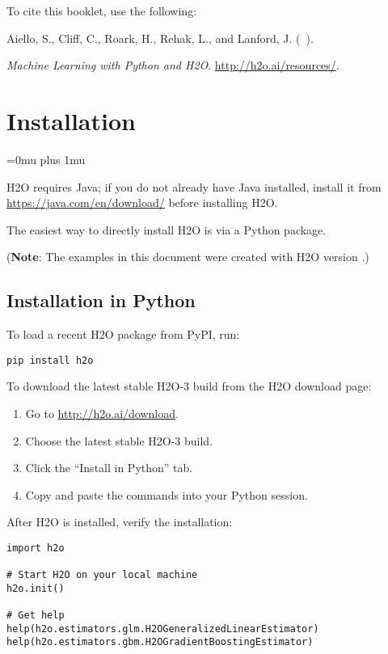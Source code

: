 To cite this booklet, use the following: 

Aiello, S., Cliff, C., Roark, H., Rehak, L., and Lanford, J. (\shortmonthname\ \the\year). {\textit{Machine Learning with Python and H2O}. {\url{http://h2o.ai/resources/}}.


\section{Installation} 
\Urlmuskip=0mu plus 1mu\relax %

H2O requires Java; if you do not already have Java installed, install it from {\url{https://java.com/en/download/}} before installing H2O. 

The easiest way to directly install H2O is  via a Python package.

({\bf{Note}}: The examples in this document were created with H2O version \waterVersion.)

\subsection{Installation in Python}

To load a recent H2O package from PyPI, run:

\begin{lstlisting}[style=python]
pip install h2o
\end{lstlisting}

To download the
latest stable H2O-3 build from the H2O download page:

\begin{enumerate}
\item Go to {\url{http://h2o.ai/download}}.
\item Choose the latest stable H2O-3 build.
\item Click the ``Install in Python'' tab.
\item Copy and paste the commands into your Python session.
\end{enumerate}

After H2O is installed, verify the installation:

\begin{lstlisting}[style=python]
import h2o

# Start H2O on your local machine
h2o.init()

# Get help
help(h2o.estimators.glm.H2OGeneralizedLinearEstimator)
help(h2o.estimators.gbm.H2OGradientBoostingEstimator)


\end{lstlisting}}
